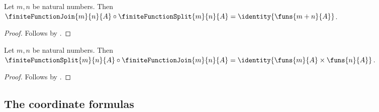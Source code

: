 \begin{theorem}\label{finite_function_join_split}
    Let $m,n$ be natural numbers.
    Then $\finiteFunctionJoin{m}{n}{A}\circ\finiteFunctionSplit{m}{n}{A}
        =\identity{\funs{m+n}{A}}$.
\end{theorem}
\begin{proof}
    Follows by .
\end{proof}

\begin{theorem}\label{finite_function_split_join}
    Let $m,n$ be natural numbers.
    Then $\finiteFunctionSplit{m}{n}{A}\circ\finiteFunctionJoin{m}{n}{A}
        =\identity{\funs{m}{A}\times\funs{n}{A}}$.
\end{theorem}
\begin{proof}
    Follows by .
\end{proof}

\subsection{The coordinate formulas}

